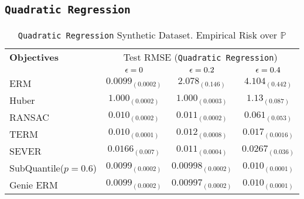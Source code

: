 \documentclass{article} %
\newcommand{\subhead}[1]{\multicolumn{1}{c}{#1}}%
\begin{document}
\begin{appendices}
	\subsection{\texttt{Quadratic Regression}}
	\begin{table}[!h]
	\centering
	\begin{tabular}{lccc}
		\toprule 
		\textbf{Objectives}&\multicolumn{3}{c}{Test RMSE (\texttt{Quadratic Regression})}\\                   
		\cmidrule(rl){2-4}
		&\subhead{${\epsilon} = 0$}& \subhead{${\epsilon} = 0.2$}& \subhead{${\epsilon} = 0.4$}\\ 
		\midrule
		ERM  &$0.0099_{(0.0002)}$&$2.078_{(0.146)}$&$4.104_{(0.442)}$\\
		Huber \cite{Huber2009} &$1.000_{(0.0002)}$&$1.000_{(0.0003)}$&$1.13_{(0.087)}$\\
		RANSAC \cite{RANSAC1981} &$0.010_{(0.0002)}$&$0.011_{(0.0002)}$&$0.061_{(0.053)}$\\
		TERM \cite{li2020tilted} &$0.010_{(0.0001)}$&$0.012_{(0.0008)}$&$0.017_{(0.0016)}$\\
		SEVER \cite{DiakonikolasKKLSS19} &$0.0166_{(0.007)}$&$0.011_{(0.0004)}$&$0.0267_{(0.036)}$\\
		\rowcolor{LightCyan}
		SubQuantile($p = 0.6$) &$\mathbf{0.0099_{(0.0002)}}$&$\mathbf{0.00998_{(0.0002)}}$&$\mathbf{0.010_{(0.0001)}}$\\
		\midrule 
		Genie ERM &$0.0099_{(0.0002)}$&$0.00997_{(0.0002)}$&$0.010_{(0.0001)}$\\
		\bottomrule
	\end{tabular}
	\caption{\texttt{Quadratic Regression} Synthetic Dataset. Empirical Risk over $\mathbb{P}$}
	\label{tab:quadratic-regression}
	\end{table}


\end{appendices}
\end{document}
